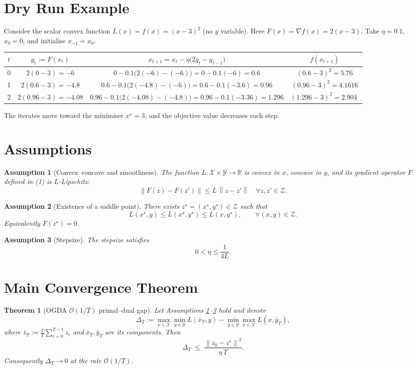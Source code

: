 \documentclass{article}
\newtheorem{theorem}{Theorem}
\newtheorem{assumption}{Assumption}
\newcommand{\norm}[1]{\left\lVert#1\right\rVert}
\newcommand{\R}{\mathbb{R}}
\begin{document}
\section*{Dry Run Example}
Consider the scalar convex function $L(x)=f(x)=(x-3)^2$ (no $y$ variable).  
Here $F(x)=\nabla f(x)=2(x-3)$.  
Take $\eta=0.1$, $x_0=0$, and initialise $x_{-1}=x_0$.

\begin{center}
\begin{tabular}{c|c|c|c}
$t$ & $g_t:=F(x_t)$ & $x_{t+1}=x_t-\eta\bigl(2g_t-g_{t-1}\bigr)$ & $f(x_{t+1})$\\ \hline
0 & $2(0-3)=-6$ & $0-0.1\bigl(2(-6)-(-6)\bigr)=0-0.1(-6)=0.6$ & $(0.6-3)^2=5.76$\\
1 & $2(0.6-3)=-4.8$ & $0.6-0.1\bigl(2(-4.8)-(-6)\bigr)=0.6-0.1(-3.6)=0.96$ & $(0.96-3)^2=4.1616$\\
2 & $2(0.96-3)=-4.08$ & $0.96-0.1\bigl(2(-4.08)-(-4.8)\bigr)=0.96-0.1(-3.36)=1.296$ & $(1.296-3)^2=2.904\;$\\
\end{tabular}
\end{center}
The iterates move toward the minimiser $x^\star=3$, and the objective value decreases each step.

\newpage

\section*{Assumptions}
\begin{assumption}[Convex–concave and smoothness]\label{ass:cc}
The function $L:\mathcal X\times\mathcal Y\rightarrow\R$ is convex in $x$,
concave in $y$, and its gradient operator $F$ defined in (1) is $L$‑Lipschitz:
\[
\norm{F(z)-F(z')}\le L\,\norm{z-z'}\quad\forall z,z'\in\mathcal Z .
\]
\end{assumption}
\begin{assumption}[Existence of a saddle point]\label{ass:saddle}
There exists $z^\star=(x^\star,y^\star)\in\mathcal Z$ such that
\[
L(x^\star,y)\le L(x^\star,y^\star)\le L(x,y^\star),\qquad\forall (x,y)\in\mathcal Z .
\]
Equivalently $F(z^\star)=0$.
\end{assumption}
\begin{assumption}[Stepsize]\label{ass:stepsize}
The stepsize satisfies
\[
0<\eta\le\frac{1}{4L}.
\]
\end{assumption}

\section*{Main Convergence Theorem}
\begin{theorem}[OGDA $\mathcal O(1/T)$ primal–dual gap]\label{thm:ogda}
Let Assumptions \ref{ass:cc}–\ref{ass:stepsize} hold and denote
\[
\Delta_T:=\max_{x\in\mathcal X}\min_{y\in\mathcal Y} L(\bar x_T,y)-\min_{y\in\mathcal Y}\max_{x\in\mathcal X} L(x,\bar y_T),
\]
where $\bar z_T:=\frac1T\sum_{t=0}^{T-1}z_t$ and $\bar x_T,\bar y_T$ are its components.
Then
\[
\Delta_T\;\le\;\frac{\norm{z_0-z^\star}^2}{\eta\,T}.
\tag{3}
\]
Consequently $\Delta_T\to0$ at the rate $\mathcal O(1/T)$.
\end{theorem}
\end{document}

